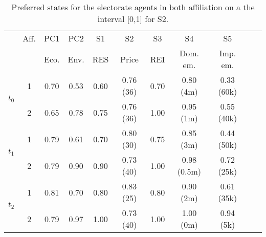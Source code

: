 \begin{table}
\begin{center}
\begin{tabular}{ |c|c|c|c|c|c|c|c|c|c|c| } 
\hline
		
			& Aff. 	& PC1 	& PC2	& S1		& S2			& S3		& S4			& S5		\\ 
			&		& Eco.	& Env.	& RES	& Price		& REI	& Dom. em.	& Imp. em.\\ \hline \hline

\multirow{2}{*}{$t_0$}
			& 1		& 0.70	& 0.53	& 0.60	& 0.76 (36)	& 0.70	& 0.80 (4m)	& 0.33 (60k)	\\ \cline{2-9}
			& 2		& 0.65	& 0.78	& 0.75	& 0.76 (36) 	& 1.00	& 0.95 (1m)	& 0.55 (40k)	\\ \hline \hline
					
\multirow{2}{*}{$t_1$}
			& 1		& 0.79	& 0.61	& 0.70	& 0.80 (30)	& 0.75	& 0.85 (3m)	& 0.44 (50k)	\\ \cline{2-9}
			& 2		& 0.79	& 0.90	& 0.90	& 0.73 (40)	& 1.00	& 0.98 (0.5m)	& 0.72 (25k)	\\ \hline \hline
					
\multirow{2}{*}{$t_2$}
			&1		& 0.81	& 0.70	& 0.80	& 0.83 (25)	& 0.80	& 0.90 (2m)	& 0.61 (35k)	\\ \cline{2-9}
			& 2		& 0.79	& 0.97	& 1.00	& 0.73 (40)	& 1.00	& 1.00 (0m)	& 0.94 (5k)	\\
\hline
\end{tabular}
\end{center}
\caption{Preferred states for the electorate agents in both affiliation on a the interval [0,1] for S2.}
\label{tab:preferredStates_Elec_S2}
\end{table}

